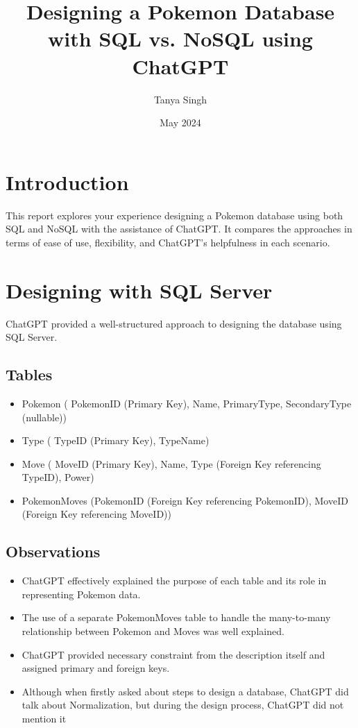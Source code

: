 \documentclass{article}
\title{Designing a Pokemon Database with SQL vs. NoSQL using ChatGPT}
\author{Tanya Singh}
\date{May 2024}
\begin{document}
\maketitle

\section{Introduction}
This report explores your experience designing a Pokemon database using both SQL and NoSQL with the assistance of ChatGPT. It compares the approaches in terms of ease of use, flexibility, and ChatGPT's helpfulness in each scenario.

\section{Designing with SQL Server}
ChatGPT provided a well-structured approach to designing the database using SQL Server.
\subsection{Tables}
\begin{itemize}
    \item Pokemon ( PokemonID (Primary Key), Name, PrimaryType, SecondaryType (nullable))
    \item Type ( TypeID (Primary Key), TypeName)
    \item Move ( MoveID (Primary Key), Name, Type (Foreign Key referencing TypeID), Power)
    \item PokemonMoves (PokemonID (Foreign Key referencing PokemonID), MoveID (Foreign Key referencing MoveID))
\end{itemize}
\subsection{Observations}
\begin{itemize}
    \item ChatGPT effectively explained the purpose of each table and its role in representing Pokemon data.
    \item The use of a separate PokemonMoves table to handle the many-to-many relationship between Pokemon and Moves was well explained.
    \item ChatGPT provided necessary constraint from the description itself and assigned primary and foreign keys.
    \item Although when firstly asked about steps to design a database, ChatGPT did talk about Normalization, but during the design process, ChatGPT did not mention it
\end{itemize}
\end{document}
